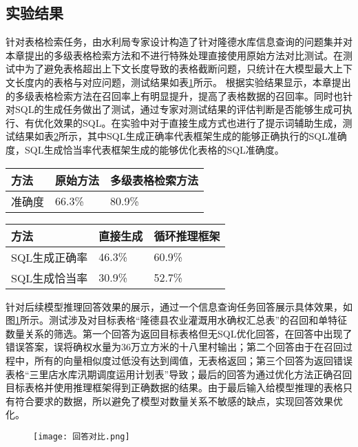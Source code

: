 \subsection{实验结果}
针对表格检索任务，由水利局专家设计构造了针对隆德水库信息查询的问题集并对本章提出的多级表格检索方法和不进行特殊处理直接使用原始方法对比测试。在测试中为了避免表格超出上下文长度导致的表格截断问题，只统计在大模型最大上下文长度内的表格与对应问题，测试结果如表\ref{tab:table-retrival-results}所示。
根据实验结果显示，本章提出的多级表格检索方法在召回率上有明显提升，提高了表格数据的召回率。同时也针对SQL的生成任务做出了测试，通过专家对测试结果的评估判断是否能够生成可执行、有优化效果的SQL。在实验中对于直接生成方式也进行了提示词辅助生成，测试结果如表\ref{tab:SQL-Generation-results}所示，其中SQL生成正确率代表框架生成的能够正确执行的SQL准确度，SQL生成恰当率代表框架生成的能够优化表格的SQL准确度。
\begin{table}[h]
    \centering
    \label{tab:table-retrival-results}
    \begin{tabularx}{\linewidth}{XXX}
        \toprule[1.5pt]
        {方法} & {原始方法} & {多级表格检索方法} \\
        \midrule[1pt]
        {准确度} & 66.3\% & 80.9\% \\
        \bottomrule[1.5pt]
    \end{tabularx}
\end{table}
\begin{table}[h]
    \centering
    \label{tab:SQL-Generation-results}
    \begin{tabularx}{\linewidth}{XXX}
        \toprule[1.5pt]
        {方法} & {直接生成} & {循环推理框架} \\
        \midrule[1pt]
        {SQL生成正确率} & 46.3\% & 60.9\% \\
        {SQL生成恰当率} & 30.9\% & 52.7\% \\
        \bottomrule[1.5pt]
    \end{tabularx}
\end{table}

针对后续模型推理回答效果的展示，通过一个信息查询任务回答展示具体效果，如图\ref{fig:4-9}所示。测试涉及对目标表格“隆德县农业灌溉用水确权汇总表”的召回和单特征数量关系的筛选。第一个回答为返回目标表格但无SQL优化回答，在回答中出现了错误答案，误将确权水量为36万立方米的十八里村输出；第二个回答由于在召回过程中，所有的向量相似度过低没有达到阈值，无表格返回；第三个回答为返回错误表格“三里店水库汛期调度运用计划表”导致；最后的回答为通过优化方法正确召回目标表格并使用推理框架得到正确数据的结果。由于最后输入给模型推理的表格只有符合要求的数据，所以避免了模型对数量关系不敏感的缺点，实现回答效果优化。
\begin{figure}[h]
    \centering
    \texttt{[image: 回答对比.png]}
    \label{fig:4-9}
\end{figure}
